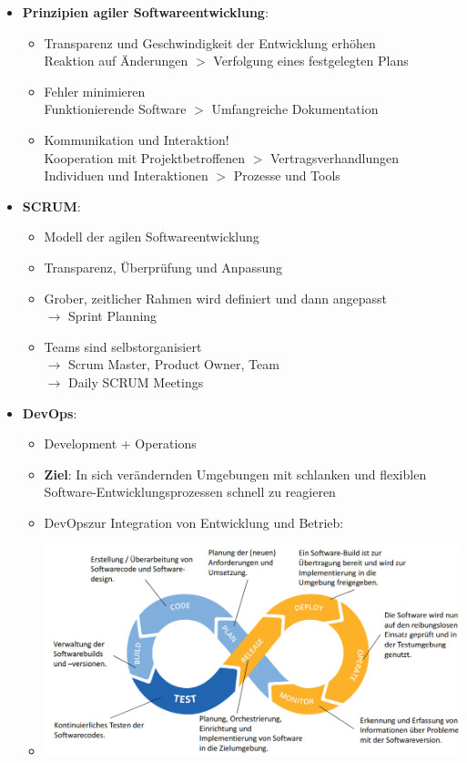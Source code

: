 \documentclass[12pt,a4paper]{article}
\begin{document}
\begin{itemize}
   \item \textbf{Prinzipien agiler Softwareentwicklung}:
      \begin{itemize}
			\item Transparenz und Geschwindigkeit der Entwicklung erhöhen\\
			      Reaktion auf Änderungen $>$ Verfolgung eines festgelegten Plans
			\item Fehler minimieren\\
			      Funktionierende Software $>$ Umfangreiche Dokumentation
			\item Kommunikation und Interaktion!\\
			      Kooperation mit Projektbetroffenen $>$ Vertragsverhandlungen\\
			      Individuen und Interaktionen $>$ Prozesse und Tools
      \end{itemize}
   
   \item \textbf{SCRUM}:
      \begin{itemize}
			\item Modell der agilen Softwareentwicklung
			\item Transparenz, Überprüfung und Anpassung
			\item Grober, zeitlicher Rahmen wird definiert und dann angepasst\\
			      $\rightarrow$ Sprint Planning
			\item Teams sind selbstorganisiert\\
			      $\rightarrow$  Scrum Master, Product Owner, Team\\
			      $\rightarrow$ Daily SCRUM Meetings
      \end{itemize}
   
   \item \textbf{DevOps}:
      \begin{itemize}
			\item Development + Operations
			\item \textbf{Ziel}: In sich verändernden Umgebungen mit schlanken und flexiblen Software-Entwicklungsprozessen schnell zu reagieren
			\item DevOpszur Integration von Entwicklung und Betrieb:
			\item[] \includegraphics[scale=0.45]{DevOps.png}
			

\end{itemize}
\end{itemize}
\end{document}
